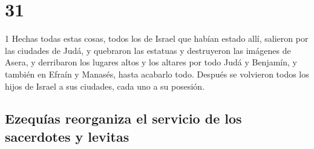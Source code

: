 \chapter{31}

\par 1 Hechas todas estas cosas, todos los de Israel que habían estado allí, salieron por las ciudades de Judá, y quebraron las estatuas y destruyeron las imágenes de Asera, y derribaron los lugares altos y los altares por todo Judá y Benjamín, y también en Efraín y Manasés, hasta acabarlo todo. Después se volvieron todos los hijos de Israel a sus ciudades, cada uno a su posesión.

\section*{Ezequías reorganiza el servicio de los sacerdotes y levitas}


